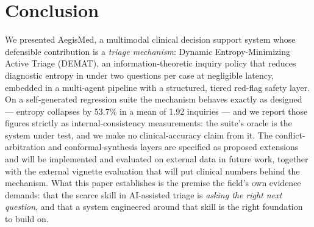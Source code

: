 \documentclass[10pt,twocolumn]{article}
\begin{document}
\section{Conclusion}
We presented AegisMed, a multimodal clinical decision support system whose defensible contribution is a \emph{triage mechanism}: Dynamic Entropy-Minimizing Active Triage (DEMAT), an information-theoretic inquiry policy that reduces diagnostic entropy in under two questions per case at negligible latency, embedded in a multi-agent pipeline with a structured, tiered red-flag safety layer. On a self-generated regression suite the mechanism behaves exactly as designed --- entropy collapses by 53.7\% in a mean of 1.92 inquiries --- and we report those figures strictly as internal-consistency measurements: the suite's oracle is the system under test, and we make no clinical-accuracy claim from it. The conflict-arbitration and conformal-synthesis layers are specified as proposed extensions and will be implemented and evaluated on external data in future work, together with the external vignette evaluation that will put clinical numbers behind the mechanism. What this paper establishes is the premise the field's own evidence demands: that the scarce skill in AI-assisted triage is \emph{asking the right next question}, and that a system engineered around that skill is the right foundation to build on.



\end{document}
